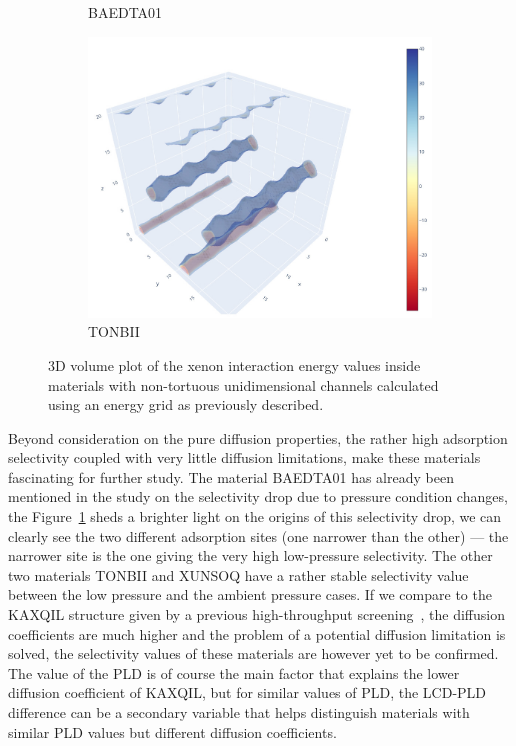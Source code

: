 \documentclass[main]{subfiles}
\begin{document}
\begin{figure}[ht]
\begin{subfigure}[b]{0.3\textwidth}
      \caption{BAEDTA01~\cite{Chen_2010}}\label{fgr:tube_cavities_b}
  \end{subfigure}
  \hfill
  \begin{subfigure}[b]{0.3\textwidth}
      \centering
      \includegraphics[width=\textwidth]{figures/5-diffusion/viz/TONBII.jpg}
      \caption{TONBII~\cite{Du_2010}}\label{fgr:tube_cavities_c}
  \end{subfigure}
     \caption{ 3D volume plot of the xenon interaction energy values inside materials with non-tortuous unidimensional channels calculated using an energy grid as previously described.}\label{fgr:tube_cavities}
\end{figure}

Beyond consideration on the pure diffusion properties, the rather high adsorption selectivity coupled with very little diffusion limitations, make these materials fascinating for further study. The material BAEDTA01 has already been mentioned in the study on the selectivity drop due to pressure condition changes, the Figure~\ref{fgr:tube_cavities_b} sheds a brighter light on the origins of this selectivity drop, we can clearly see the two different adsorption sites (one narrower than the other) --- the narrower site is the one giving the very high low-pressure selectivity. The other two materials TONBII and XUNSOQ have a rather stable selectivity value between the low pressure and the ambient pressure cases. If we compare to the KAXQIL structure given by a previous high-throughput screening~\autocite{Simon_2015}, the diffusion coefficients are much higher and the problem of a potential diffusion limitation is solved, the selectivity values of these materials are however yet to be confirmed. The value of the PLD is of course the main factor that explains the lower diffusion coefficient of KAXQIL, but for similar values of PLD, the LCD-PLD difference can be a secondary variable that helps distinguish materials with similar PLD values but different diffusion coefficients. 
\end{document}
